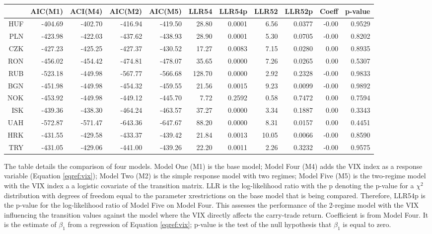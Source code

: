 \documentclass[12pt, a4paper, oneside]{article} %
\begin{document}
\begin{landscape}
\begin{table}[ht]
\begin{threeparttable}
\centering
\begin{tabular}{rrrrrrrrrrr}
  \hline
 & AIC(M1) & ACI(M4) & AIC(M2) & AIC(M5) & LLR54 & LLR54p & LLR52 & LLR52p & Coeff & p-value \\ 
  \hline
HUF & -404.69 & -402.70 & -416.94 & -419.50 & 28.80 & 0.0001 & 6.56 & 0.0377 & -0.00 & 0.9529 \\ 
  PLN & -423.98 & -422.03 & -437.62 & -438.93 & 28.90 & 0.0001 & 5.30 & 0.0705 & -0.00 & 0.8202 \\ 
  CZK & -427.23 & -425.25 & -427.37 & -430.52 & 17.27 & 0.0083 & 7.15 & 0.0280 & 0.00 & 0.8935 \\ 
  RON & -456.02 & -454.42 & -474.81 & -478.07 & 35.65 & 0.0000 & 7.26 & 0.0265 & 0.00 & 0.5307 \\ 
  RUB & -523.18 & -449.98 & -567.77 & -566.68 & 128.70 & 0.0000 & 2.92 & 0.2328 & -0.00 & 0.9833 \\ 
  BGN & -451.98 & -449.98 & -454.32 & -459.55 & 21.56 & 0.0015 & 9.23 & 0.0099 & -0.00 & 0.9892 \\ 
  NOK & -453.92 & -449.98 & -449.12 & -445.70 & 7.72 & 0.2592 & 0.58 & 0.7472 & 0.00 & 0.7594 \\ 
  ISK & -439.36 & -438.30 & -464.24 & -463.57 & 37.27 & 0.0000 & 3.34 & 0.1887 & 0.00 & 0.3343 \\ 
  UAH & -572.87 & -571.47 & -643.36 & -647.67 & 88.20 & 0.0000 & 8.31 & 0.0157 & 0.00 & 0.4451 \\ 
  HRK & -431.55 & -429.58 & -433.37 & -439.42 & 21.84 & 0.0013 & 10.05 & 0.0066 & -0.00 & 0.8590 \\ 
  TRY & -431.05 & -429.06 & -441.00 & -439.26 & 22.20 & 0.0011 & 2.26 & 0.3232 & -0.00 & 0.9575 \\ 
   \hline
\end{tabular}
\begin{tablenotes}
\small
\item The table details the comparison of four models.  Model One (M1) is the base model; Model Four (M4) adds the VIX index as a response variable (Equation \ref{eqref:vix}); Model Two (M2) is the simple response model with two regimes; Model Five (M5) is the two-regime model with the VIX index a a logistic covariate of the transition matrix. LLR is the log-likelihood ratio with the p denoting the p-value for a $\chi^2$ distribution with degrees of freedom equal to the parameter xrestrictions on the base model that is being compared.  Therefore, LLR54p is the p-value for the log-likelihood ratio of Model Five on Model Four.  This assesses the performance of the 2-regime model with the VIX influencing the transition values against the model where the VIX directly affects the carry-trade return. Coefficient is from Model Four.  It is the estimate of $\beta_1$ from a regression of Equation \ref{eqref:vix}; p-value is the test of the null hypothesis that $\beta_1$ is equal to zero. 

\end{tablenotes}
\end{threeparttable}
\end{table}
\end{landscape}
\end{document}
